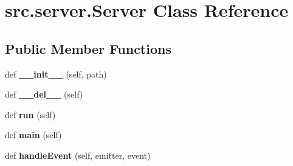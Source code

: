 \hypertarget{classsrc_1_1server_1_1_server}{}\section{src.\+server.\+Server Class Reference}
\label{classsrc_1_1server_1_1_server}
\subsection*{Public Member Functions}
\begin{DoxyCompactItemize}
\item 
\hypertarget{classsrc_1_1server_1_1_server_a27ea9745051f704a10fd34ad245aa434}{}\label{classsrc_1_1server_1_1_server_a27ea9745051f704a10fd34ad245aa434} 
def {\bfseries \+\_\+\+\_\+init\+\_\+\+\_\+} (self, path)
\item 
\hypertarget{classsrc_1_1server_1_1_server_ac0c681fd1c348e0264de78a8e10ceb72}{}\label{classsrc_1_1server_1_1_server_ac0c681fd1c348e0264de78a8e10ceb72} 
def {\bfseries \+\_\+\+\_\+del\+\_\+\+\_\+} (self)
\item 
\hypertarget{classsrc_1_1server_1_1_server_a4684dc4abbdb9872a96dfe0180a4b86a}{}\label{classsrc_1_1server_1_1_server_a4684dc4abbdb9872a96dfe0180a4b86a} 
def {\bfseries run} (self)
\item 
\hypertarget{classsrc_1_1server_1_1_server_a977b8613f70094801c988c818e83fd83}{}\label{classsrc_1_1server_1_1_server_a977b8613f70094801c988c818e83fd83} 
def {\bfseries main} (self)
\item 
\hypertarget{classsrc_1_1server_1_1_server_ac18ec25ce0de8a0984b7ba3e7f77d937}{}\label{classsrc_1_1server_1_1_server_ac18ec25ce0de8a0984b7ba3e7f77d937} 
def {\bfseries handle\+Event} (self, emitter, event)
\end{DoxyCompactItemize}
